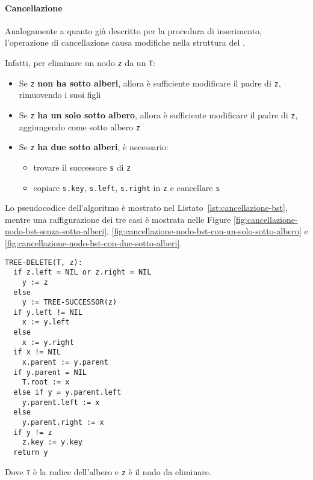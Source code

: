 \documentclass[italian, 10pt]{article}
\begin{document}
\paragraph{Cancellazione}
\label{par:cancellazione-bst}

Analogamente a quanto già descritto per la procedura di inserimento, l'operazione di cancellazione causa modifiche nella struttura del \BST.

Infatti, per eliminare un nodo \texttt{z} da un \BST \texttt{T}:

\begin{itemize}
  \item Se \texttt{z} \textbf{non ha sotto alberi}, allora è sufficiente modificare il padre di \texttt{z}, rimuovendo i suoi figli
  \item Se \texttt{z} \textbf{ha un solo sotto albero}, allora è sufficiente modificare il padre di \texttt{z}, aggiungendo come sotto albero \texttt{z}
  \item Se \texttt{z} \textbf{ha due sotto alberi}, è necessario:
        \begin{itemize}
          \item trovare il successore \texttt{s} di \texttt{z}
          \item copiare \texttt{s.key}, \texttt{s.left}, \texttt{s.right} in \texttt{z} e cancellare \texttt{s}
        \end{itemize}
\end{itemize}

Lo pseudocodice dell'algoritmo è mostrato nel Listato~\ref{lst:cancellazione-bst}, mentre una raffigurazione dei tre casi è mostrata nelle Figure \ref{fig:cancellazione-nodo-bst-senza-sotto-alberi}, \ref{fig:cancellazione-nodo-bst-con-un-solo-sotto-albero} e \ref{fig:cancellazione-nodo-bst-con-due-sotto-alberi}.

\begin{lstlisting}[style=pseudocode, caption={Cancellazione di un nodo}, label={lst:cancellazione-bst}]
TREE-DELETE(T, z):
  if z.left = NIL or z.right = NIL
    y := z
  else
    y := TREE-SUCCESSOR(z)
  if y.left != NIL
    x := y.left
  else
    x := y.right
  if x != NIL
    x.parent := y.parent
  if y.parent = NIL
    T.root := x
  else if y = y.parent.left
    y.parent.left := x
  else
    y.parent.right := x
  if y != z
    z.key := y.key
  return y
\end{lstlisting}

Dove \texttt{T} è la radice dell'albero e \texttt{z} è il nodo da eliminare.
\end{document}
